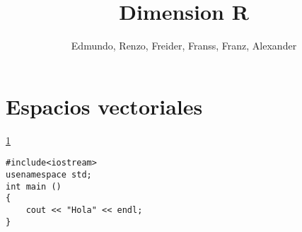 \documentclass{article}
\title{Dimension R}
\author{Edmundo, Renzo, Freider, Franss, Franz, Alexander}
\begin{document}
\maketitle{}
\section{Espacios vectoriales}
\label{vectores}

\newpage

\ref{vectores}


\begin{verbatim}
#include<iostream>
usenamespace std;
int main ()
{
	cout << "Hola" << endl;
}
\end{verbatim}

\end{document}

